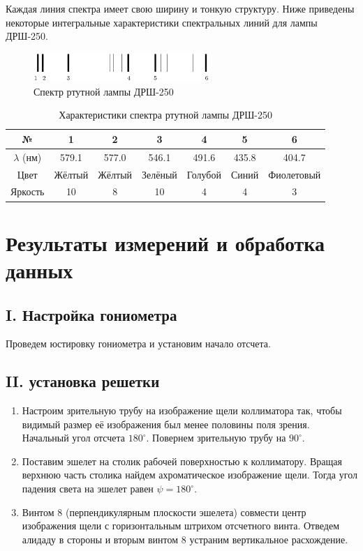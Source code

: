 \documentclass[a4paper,12pt]{article}
\begin{document}
Каждая линия спектра имеет свою ширину и тонкую структуру. Ниже приведены некоторые интегральные характеристики спектральных линий для лампы ДРШ-250.

\begin{figure}[h]
    \centering
    \includegraphics[width=0.6\textwidth]{lamp_spectr.png}
    \caption{Спектр ртутной лампы ДРШ-250}
    \label{pic:lamp_spectr}
\end{figure}

\begin{table}[h]
    \centering
    \caption{Характеристики спектра ртутной лампы ДРШ-250}
    \begin{tabular}{|c|c|c|c|c|c|c|}
        \hline
        № & 1 & 2 & 3 & 4 & 5 & 6 \\ \hline
        $\lambda$ (нм) & 579.1 & 577.0 & 546.1 & 491.6 & 435.8 & 404.7 \\ \hline
        Цвет & Жёлтый & Жёлтый & Зелёный & Голубой & Синий & Фиолетовый \\ \hline
        Яркость & 10 & 8 & 10 & 4 & 4 & 3 \\ \hline
    \end{tabular}
    \label{tab:mercury_spectrum}
\end{table}

\section{Результаты измерений и обработка данных}

\subsection*{I. Настройка гониометра}

Проведем юстировку гониометра и установим начало отсчета.

\subsection*{II. установка решетки}

\begin{enumerate}
    \item Настроим зрительную трубу на изображение щели коллиматора так, чтобы видимый размер её изображения был менее половины поля зрения. Начальный угол отсчета $180^\circ$. Повернем зрительную трубу на $90^\circ$.
    \item Поставим эшелет на столик рабочей поверхностью к коллиматору. Вращая верхнюю часть столика найдем ахроматическое изображение щели. Тогда угол падения света на эшелет равен $\psi = 180^\circ$.
    \item Винтом 8 (перпендикулярным плоскости эшелета) совмести центр изображения щели с горизонтальным штрихом отсчетного винта. Отведем алидаду в стороны и вторым винтом 8 устраним вертикальное расхождение.
\end{enumerate}
\end{document}
